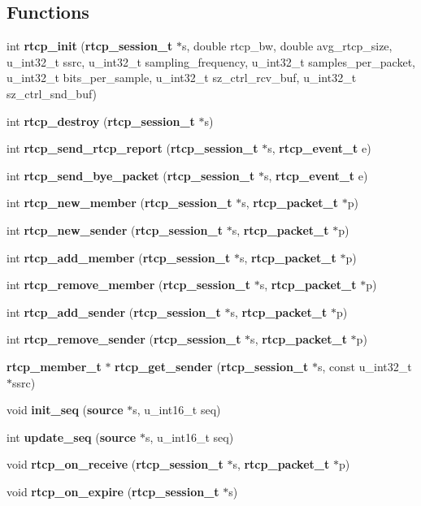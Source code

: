 \subsection*{Functions}
\begin{CompactItemize}
\item 
int {\bf rtcp\_\-init} ({\bf rtcp\_\-session\_\-t} $\ast$s, double rtcp\_\-bw, double avg\_\-rtcp\_\-size, u\_\-int32\_\-t ssrc, u\_\-int32\_\-t sampling\_\-frequency, u\_\-int32\_\-t samples\_\-per\_\-packet, u\_\-int32\_\-t bits\_\-per\_\-sample, u\_\-int32\_\-t sz\_\-ctrl\_\-rcv\_\-buf, u\_\-int32\_\-t sz\_\-ctrl\_\-snd\_\-buf)
\item 
int {\bf rtcp\_\-destroy} ({\bf rtcp\_\-session\_\-t} $\ast$s)
\item 
int {\bf rtcp\_\-send\_\-rtcp\_\-report} ({\bf rtcp\_\-session\_\-t} $\ast$s, {\bf rtcp\_\-event\_\-t} e)
\item 
int {\bf rtcp\_\-send\_\-bye\_\-packet} ({\bf rtcp\_\-session\_\-t} $\ast$s, {\bf rtcp\_\-event\_\-t} e)
\item 
int {\bf rtcp\_\-new\_\-member} ({\bf rtcp\_\-session\_\-t} $\ast$s, {\bf rtcp\_\-packet\_\-t} $\ast$p)
\item 
int {\bf rtcp\_\-new\_\-sender} ({\bf rtcp\_\-session\_\-t} $\ast$s, {\bf rtcp\_\-packet\_\-t} $\ast$p)
\item 
int {\bf rtcp\_\-add\_\-member} ({\bf rtcp\_\-session\_\-t} $\ast$s, {\bf rtcp\_\-packet\_\-t} $\ast$p)
\item 
int {\bf rtcp\_\-remove\_\-member} ({\bf rtcp\_\-session\_\-t} $\ast$s, {\bf rtcp\_\-packet\_\-t} $\ast$p)
\item 
int {\bf rtcp\_\-add\_\-sender} ({\bf rtcp\_\-session\_\-t} $\ast$s, {\bf rtcp\_\-packet\_\-t} $\ast$p)
\item 
int {\bf rtcp\_\-remove\_\-sender} ({\bf rtcp\_\-session\_\-t} $\ast$s, {\bf rtcp\_\-packet\_\-t} $\ast$p)
\item 
{\bf rtcp\_\-member\_\-t} $\ast$ {\bf rtcp\_\-get\_\-sender} ({\bf rtcp\_\-session\_\-t} $\ast$s, const u\_\-int32\_\-t $\ast$ssrc)
\item 
void {\bf init\_\-seq} ({\bf source} $\ast$s, u\_\-int16\_\-t seq)
\item 
int {\bf update\_\-seq} ({\bf source} $\ast$s, u\_\-int16\_\-t seq)
\item 
void {\bf rtcp\_\-on\_\-receive} ({\bf rtcp\_\-session\_\-t} $\ast$s, {\bf rtcp\_\-packet\_\-t} $\ast$p)
\item 
void {\bf rtcp\_\-on\_\-expire} ({\bf rtcp\_\-session\_\-t} $\ast$s)

\end{CompactItemize}
